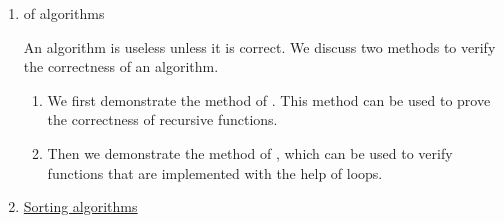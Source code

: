 \begin{enumerate}
      The notion of a \href{http://en.wikipedia.org/wiki/Recurrence_relation}{recurrence relation}
      is the discrete analogue of the notion of a 
      \href{http://en.wikipedia.org/wiki/Differential_equation}{differential equation}.
      For example, the equation
      \\[0.2cm]
      \hspace*{1.3cm}
      $a_{n+2} = a_{n+1} + a_n$
      \\[0.2cm]
      is a recurrence relation.  Together with the initial values $a_0 = 0$ and $a_1 = 1$, this equation
      defines a sequence of natural numbers.  The numbers $a_n$ for $n = 0,\cdots,8$ are given as follows:
      \\[0.2cm]
      \hspace*{1.3cm}
      $a_0 = 0$, $a_1 = 1$, $a_2 = 1$, $a_3 = 2$, $a_4 = 3$, $a_5 = 5$, $a_6 = 8$, $a_7 = 13$, $a_8 = 21$. 
      \\[0.2cm]
      Later, we will see that this sequence can also be computed by
      \href{https://en.wikipedia.org/wiki/Fibonacci_number#Closed-form_expression}{Binet's formula}:
      \\[0.2cm]
      \hspace*{1.3cm}
      $\ds a_{n} = \frac{1}{\sqrt{5}} \cdot \biggl(\frac{1+\sqrt{5}}{2}\biggr)^n - \frac{1}{\sqrt{5}} \cdot \biggl(\frac{1-\sqrt{5}}{2}\biggr)^n$.
      \\[0.2cm]
      Recurrence relations occur naturally when analysing the runtime of algorithms.  We present the 
      \href{https://en.wikipedia.org/wiki/Master_theorem_(analysis_of_algorithms)}{Master Theorem} that can
      be used to compute the growth of  functions.
\item {} of algorithms

      An algorithm is useless unless it is correct.  We discuss two methods to verify the correctness
      of an algorithm.
      \begin{enumerate}
      \item We first demonstrate the method of .
            This method can be used to prove the correctness of recursive functions.
      \item Then we demonstrate the method of , which can be used to verify functions
            that are implemented with the help of loops.
      \end{enumerate}
\item \href{http://en.wikipedia.org/wiki/Sorting_algorithm}{Sorting algorithms}


\end{enumerate}
